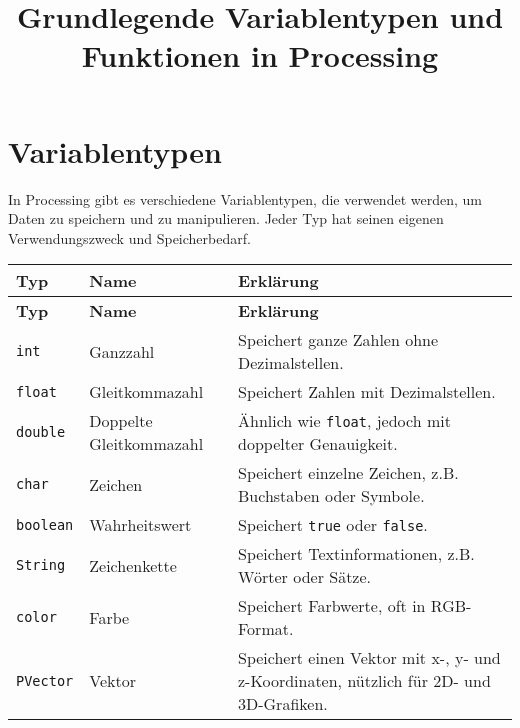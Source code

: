 \documentclass{article}
\begin{document}
\title{Grundlegende Variablentypen und Funktionen in Processing}
\author{}
\date{}
\maketitle

\section*{Variablentypen}

In Processing gibt es verschiedene Variablentypen, die verwendet werden, um Daten zu speichern und zu manipulieren. Jeder Typ hat seinen eigenen Verwendungszweck und Speicherbedarf.

\begin{longtable}{|p{}|p{}|p{}|}
\hline
\textbf{Typ} & \textbf{Name} & \textbf{Erklärung} \\
\hline
\endfirsthead

\hline
\textbf{Typ} & \textbf{Name} & \textbf{Erklärung} \\
\hline
\endhead

\texttt{int} & Ganzzahl & Speichert ganze Zahlen ohne Dezimalstellen. \\
\hline

\texttt{float} & Gleitkommazahl & Speichert Zahlen mit Dezimalstellen. \\
\hline

\texttt{double} & Doppelte Gleitkommazahl & Ähnlich wie \texttt{float}, jedoch mit doppelter Genauigkeit. \\
\hline

\texttt{char} & Zeichen & Speichert einzelne Zeichen, z.B. Buchstaben oder Symbole. \\
\hline

\texttt{boolean} & Wahrheitswert & Speichert \texttt{true} oder \texttt{false}. \\
\hline

\texttt{String} & Zeichenkette & Speichert Textinformationen, z.B. Wörter oder Sätze. \\
\hline

\texttt{color} & Farbe & Speichert Farbwerte, oft in RGB-Format. \\
\hline

\texttt{PVector} & Vektor & Speichert einen Vektor mit x-, y- und z-Koordinaten, nützlich für 2D- und 3D-Grafiken. \\
\hline


\end{longtable}
\end{document}
